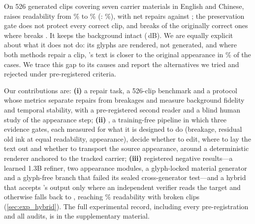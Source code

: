 On 526 generated clips covering seven carrier materials in English and Chinese, \method raises readability from \rOrigRead\% to \rOursRead\% (\steer: \rSteerRead\%), with \rOursNet{} net repairs against \rSteerNet; the preservation gate does not protect every correct clip, and \method breaks \rOursBroken{} of the \rOrigCorrect{} originally correct ones where \steer breaks \rSteerBroken. It keeps the background intact (\rOursBG\,dB). We are equally explicit about what it does not do: its glyphs are rendered, not generated, and where both methods repair a clip, \steer's text is closer to the original appearance in \rSteerCloserPct\% of the cases. We trace this gap to its causes and report the alternatives we tried and rejected under pre-registered criteria.

Our contributions are: \textbf{(i)} a repair task, a 526-clip benchmark and a protocol whose metrics separate repairs from breakages and measure background fidelity and temporal stability, with a pre-registered second reader and a blind human study of the appearance step; \textbf{(ii)} \method, a training-free pipeline in which three evidence gates, each measured for what it is designed to do (breakage, residual old ink at equal readability, appearance), decide whether to edit, where to lay the text out and whether to transport the source appearance, around a deterministic renderer anchored to the tracked carrier; \textbf{(iii)} registered negative results---a learned 1.3B refiner, two appearance modules, a glyph-locked material generator and a glyph-free branch that failed its sealed cross-generator test---and a hybrid that accepts \steer's output only where an independent verifier reads the target and otherwise falls back to \method, reaching \hVRead\% readability with \hVBroken{} broken clips (\cref{sec:exp_hybrid}). The full experimental record, including every pre-registration and all audits, is in the supplementary material.
